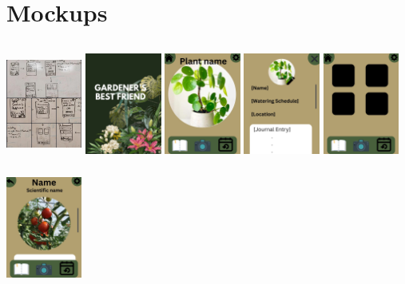 \documentclass{sigchi}
\begin{document}
\section{Mockups}
\includegraphics[width=2.5cm, height=4cm]{OldMockup}
\includegraphics[width=2.5cm, height=4cm]{Load Screen}
\includegraphics[width=2.5cm, height=4cm]{HomePlantAdded}
\includegraphics[width=2.5cm, height=4cm]{NewPlantOrEditExisting}
\includegraphics[width=2.5cm, height=4cm]{AllPlants}
\includegraphics[width=2.5cm, height=4cm]{PlantClicked}
\end{document}
